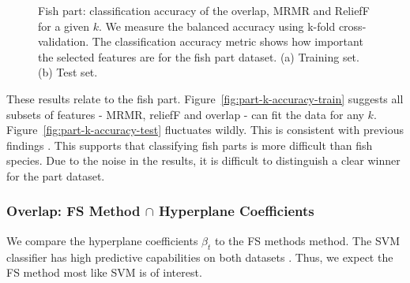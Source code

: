 \documentclass{article}
\begin{document}
\begin{figure}[htb]
  \caption[Two numerical solutions]{
    Fish part: classification accuracy of the overlap, MRMR and ReliefF for a given $k$.
    We measure the balanced accuracy using k-fold cross-validation.
    The classification accuracy metric shows how important the selected features are for the fish part dataset.
    (a) Training set. (b) Test set.}
\end{figure}

These results relate to the fish part.
Figure~\ref{fig:part-k-accuracy-train} suggests all subsets of features - MRMR, reliefF and overlap - can fit the data for any $k$.
Figure~\ref{fig:part-k-accuracy-test} fluctuates wildly.
This is consistent with previous findings \cite{wood2021classification, wood2021feature}.
This supports that classifying fish parts is more difficult than fish species.
Due to the noise in the results, it is difficult to distinguish a clear winner for the part dataset.

\subsubsection{Overlap: FS Method $\cap$ Hyperplane Coefficients}
\label{sec:results-visualisation-overlap-fs-hyperplane}

We compare the hyperplane coefficients $\beta_t$ to the FS methods method.
The SVM classifier has high predictive capabilities on both datasets \cite{wood2021classification, wood2021feature}.
Thus, we expect the FS method most like SVM is of interest.
\end{document}
